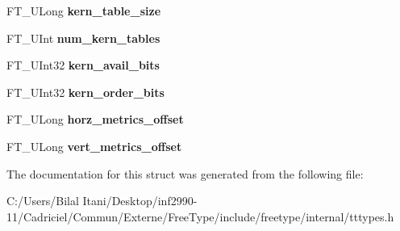 \begin{DoxyCompactItemize}
\item 
F\+T\+\_\+\+U\+Long {\bfseries kern\+\_\+table\+\_\+size}\hypertarget{struct_t_t___face_rec___acfef0fabbe95af382fb0710edfe98887}{}\label{struct_t_t___face_rec___acfef0fabbe95af382fb0710edfe98887}

\item 
F\+T\+\_\+\+U\+Int {\bfseries num\+\_\+kern\+\_\+tables}\hypertarget{struct_t_t___face_rec___a9c5b27564d0c22e0ee6edd7b6dc675c0}{}\label{struct_t_t___face_rec___a9c5b27564d0c22e0ee6edd7b6dc675c0}

\item 
F\+T\+\_\+\+U\+Int32 {\bfseries kern\+\_\+avail\+\_\+bits}\hypertarget{struct_t_t___face_rec___a5f97232ee6773a57ef8734555cc960e1}{}\label{struct_t_t___face_rec___a5f97232ee6773a57ef8734555cc960e1}

\item 
F\+T\+\_\+\+U\+Int32 {\bfseries kern\+\_\+order\+\_\+bits}\hypertarget{struct_t_t___face_rec___a810b4e002ebbdfcb44005cb69b09a917}{}\label{struct_t_t___face_rec___a810b4e002ebbdfcb44005cb69b09a917}

\item 
F\+T\+\_\+\+U\+Long {\bfseries horz\+\_\+metrics\+\_\+offset}\hypertarget{struct_t_t___face_rec___a5ff62c77d90743e333ca8dfa7d382f22}{}\label{struct_t_t___face_rec___a5ff62c77d90743e333ca8dfa7d382f22}

\item 
F\+T\+\_\+\+U\+Long {\bfseries vert\+\_\+metrics\+\_\+offset}\hypertarget{struct_t_t___face_rec___a33baf2e26d533d82f06875361fd423d1}{}\label{struct_t_t___face_rec___a33baf2e26d533d82f06875361fd423d1}

\end{DoxyCompactItemize}


The documentation for this struct was generated from the following file\+:\begin{DoxyCompactItemize}
\item 
C\+:/\+Users/\+Bilal Itani/\+Desktop/inf2990-\/11/\+Cadriciel/\+Commun/\+Externe/\+Free\+Type/include/freetype/internal/tttypes.\+h\end{DoxyCompactItemize}
